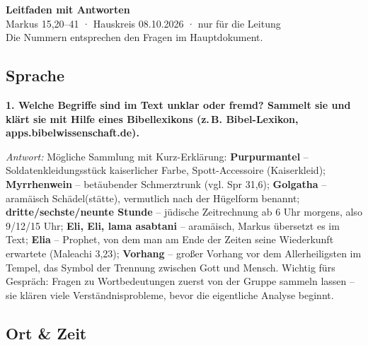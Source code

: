 \documentclass[12pt,a4paper]{article}
\newcommand{\frage}[1]{\par\vspace{0.7em}\noindent\textbf{#1}\par}
\newcommand{\antwort}[1]{\par\noindent\textit{Antwort:} #1\par}
\begin{document}
\begin{center}
  {\LARGE\bfseries Leitfaden mit Antworten}\\[4pt]
  {\large Markus 15,20--41 · Hauskreis 08.10.2026 · nur für die Leitung}\\[4pt]
  {\footnotesize Die Nummern entsprechen den Fragen im Hauptdokument.}
\end{center}

\subsection*{Sprache}

\frage{1. Welche Begriffe sind im Text unklar oder fremd? Sammelt sie und klärt sie mit Hilfe eines Bibellexikons (z.\,B. Bibel-Lexikon, apps.bibelwissenschaft.de).}
\antwort{Mögliche Sammlung mit Kurz-Erklärung: \textbf{Purpurmantel} -- Soldatenkleidungsstück kaiserlicher Farbe, Spott-Accessoire (\glqq Kaiserkleid\grqq{}); \textbf{Myrrhenwein} -- betäubender Schmerztrunk (vgl. Spr 31,6); \textbf{Golgatha} -- aramäisch \glqq Schädel(stätte)\grqq{}, vermutlich nach der Hügelform benannt; \textbf{dritte/sechste/neunte Stunde} -- jüdische Zeitrechnung ab 6 Uhr morgens, also 9/12/15 Uhr; \textbf{Eli, Eli, lama asabtani} -- aramäisch, Markus übersetzt es im Text; \textbf{Elia} -- Prophet, von dem man am Ende der Zeiten seine Wiederkunft erwartete (Maleachi 3,23); \textbf{Vorhang} -- großer Vorhang vor dem Allerheiligsten im Tempel, das Symbol der Trennung zwischen Gott und Mensch. Wichtig fürs Gespräch: Fragen zu Wortbedeutungen zuerst von der Gruppe sammeln lassen -- sie klären viele Verständnisprobleme, bevor die eigentliche Analyse beginnt.}

\subsection*{Ort \& Zeit}
\end{document}

